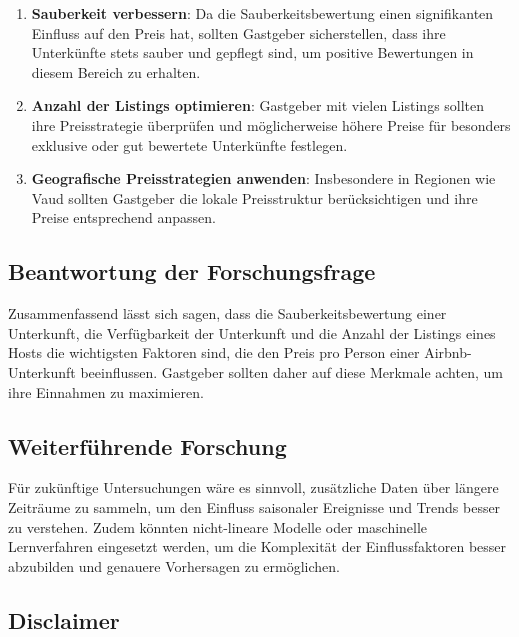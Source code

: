 \documentclass[
  journal,
]{IEEEtran}%
\begin{document}
\begin{enumerate}
\def\labelenumi{\arabic{enumi}.}
\item
  \textbf{Sauberkeit verbessern}: Da die Sauberkeitsbewertung einen
  signifikanten Einfluss auf den Preis hat, sollten Gastgeber
  sicherstellen, dass ihre Unterkünfte stets sauber und gepflegt sind,
  um positive Bewertungen in diesem Bereich zu erhalten.
\item
  \textbf{Anzahl der Listings optimieren}: Gastgeber mit vielen Listings
  sollten ihre Preisstrategie überprüfen und möglicherweise höhere
  Preise für besonders exklusive oder gut bewertete Unterkünfte
  festlegen.
\item
  \textbf{Geografische Preisstrategien anwenden}: Insbesondere in
  Regionen wie Vaud sollten Gastgeber die lokale Preisstruktur
  berücksichtigen und ihre Preise entsprechend anpassen.
\end{enumerate}

\hypertarget{beantwortung-der-forschungsfrage}{%
\subsection{Beantwortung der
Forschungsfrage}\label{beantwortung-der-forschungsfrage}}

Zusammenfassend lässt sich sagen, dass die Sauberkeitsbewertung einer
Unterkunft, die Verfügbarkeit der Unterkunft und die Anzahl der Listings
eines Hosts die wichtigsten Faktoren sind, die den Preis pro Person
einer Airbnb-Unterkunft beeinflussen. Gastgeber sollten daher auf diese
Merkmale achten, um ihre Einnahmen zu maximieren.

\hypertarget{weiterfuxfchrende-forschung}{%
\subsection{Weiterführende
Forschung}\label{weiterfuxfchrende-forschung}}

Für zukünftige Untersuchungen wäre es sinnvoll, zusätzliche Daten über
längere Zeiträume zu sammeln, um den Einfluss saisonaler Ereignisse und
Trends besser zu verstehen. Zudem könnten nicht-lineare Modelle oder
maschinelle Lernverfahren eingesetzt werden, um die Komplexität der
Einflussfaktoren besser abzubilden und genauere Vorhersagen zu
ermöglichen.

\hypertarget{disclaimer}{%
\subsection{Disclaimer}\label{disclaimer}}
\end{document}
